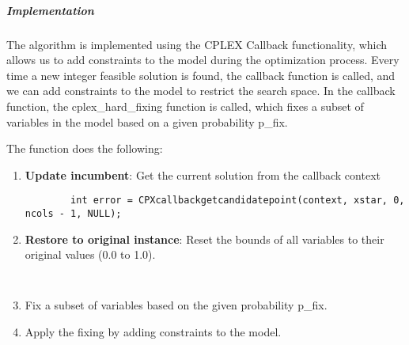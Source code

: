 \documentclass{article}
\begin{document}
\subparagraph{Implementation}
The algorithm is implemented using the CPLEX Callback functionality, which allows us to add constraints to the model during the optimization process. Every time a new integer feasible solution is found, the callback function is called, 
and we can add constraints to the model to restrict the search space. 
In the callback function, the cplex\_hard\_fixing function is called, which fixes a subset of variables in the model based on a given probability p\_fix.

The function does the following:
\begin{enumerate}
	\item \textbf{Update incumbent}: Get the current solution from the callback context
	\begin{lstlisting}
		int error = CPXcallbackgetcandidatepoint(context, xstar, 0, ncols - 1, NULL);
	\end{lstlisting}
	\item \textbf{Restore to original instance}: Reset the bounds of all variables to their original values (0.0 to 1.0).
	\begin{lstlisting}
		
	\end{lstlisting}
	\item Fix a subset of variables based on the given probability p\_fix.
	\item Apply the fixing by adding constraints to the model.
\end{enumerate}
\end{document}
